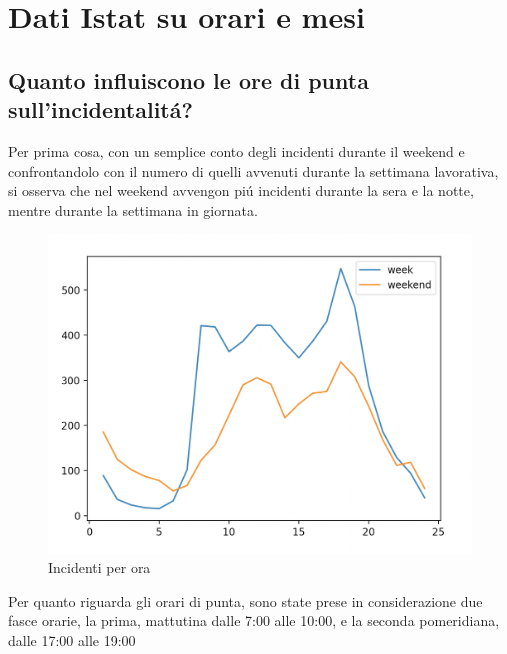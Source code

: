 \documentclass[a4paper]{report}
\begin{document}
\newpage
\section{Dati Istat su orari e mesi}

\newpage
\subsection{Quanto influiscono le ore di punta sull'incidentalit\'a?}

Per prima cosa, con un semplice conto degli incidenti durante il weekend 
e confrontandolo con il numero di quelli avvenuti durante la 
settimana lavorativa, si osserva che nel weekend avvengon pi\'u incidenti 
durante la sera e la notte, mentre durante la settimana in giornata.

\begin{figure}[!ht]
    \includegraphics[width=\linewidth]{../src/incidenti/incidenti_senza_coords/ore_punta/week_weekend.png}
    \caption{Incidenti per ora}
    \label{fig:week_weekend}
\end{figure}

Per quanto riguarda gli orari di punta, 
sono state prese in considerazione due fasce orarie, la prima, 
mattutina dalle 7:00 alle 10:00, e la seconda pomeridiana, 
dalle 17:00 alle 19:00
\end{document}
